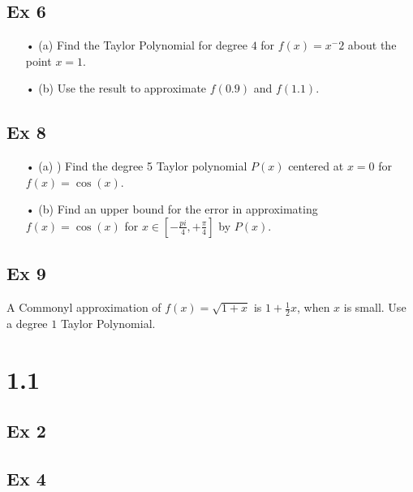\documentclass[12pt,letterpaper]{article}
\begin{document}

\subsection*{Ex 6}

\begin{itemize}

\item[•] (a) Find the Taylor Polynomial for degree $4$ for $f(x) = x^-2$ about the point $x = 1$.

\item[•] (b) Use the result to approximate $f(0.9)$ and $f(1.1)$.


\end{itemize}


\subsection*{Ex 8}

\begin{itemize}

\item[•] (a) ) Find the degree 5 Taylor polynomial $P(x)$ centered at $x = 0$ for $f(x) = \cos(x)$.

\item[•] (b) Find an upper bound for the error in approximating $f(x) = \cos(x)$ for 
$x \in [-\frac{pi}{4}, +\frac{\pi}{4}]$ by $P(x)$.


\end{itemize}


\subsection*{Ex 9}
A Commonyl approximation of $f(x) = \sqrt{1+x}$ is $1 + \frac{1}{2}x$, when $x$ is small. Use  a degree $1$ Taylor Polynomial.


\section*{1.1}


\subsection*{Ex 2}


\subsection*{Ex 4}

\end{document}
